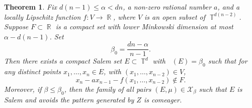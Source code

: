 \documentclass[dvipsnames,letterpaper,12pt]{article}
\numberwithin{equation}{section}
\DeclareMathOperator{\fordim}{\dim_{\mathbb{F}}}
\DeclareMathOperator{\RR}{\mathbb{R}}
\DeclareMathOperator{\TT}{\mathbb{T}}
\newtheorem{theorem}{Theorem}
\newtheorem{remark}[theorem]{Remark}
\numberwithin{theorem}{section}
\begin{document}
\begin{theorem} \label{thirdTheorem}
    Fix $d(n-1) \leq \alpha < dn$, a non-zero rational number $a$, and a locally Lipschitz function $f: V \to \RR$, where $V$ is an open subset of $\TT^{d(n-2)}$. Suppose $F \subset \RR$ is a compact set with lower Minkowski dimension at most $\alpha - d(n-1)$. Set
    \[ \beta_0 = \frac{dn - \alpha}{n - 1}. \]
    Then there exists a compact Salem set $E \subset \TT^d$ with $\fordim(E) = \beta_0$ such that for any distinct points $x_1,\dots,x_n \in E$, with $(x_1,\dots,x_{n-2}) \in V$,
    \[ x_n - a x_{n-1} - f(x_1,\dots,x_{n-2}) \not \in F. \]
    Moreover, if $\beta \leq \beta_0$, then the family of all pairs $(E,\mu) \in \mathcal{X}_\beta$ such that $E$ is Salem and avoids the pattern generated by $Z$ is comeager.
\end{theorem}


\end{document}
